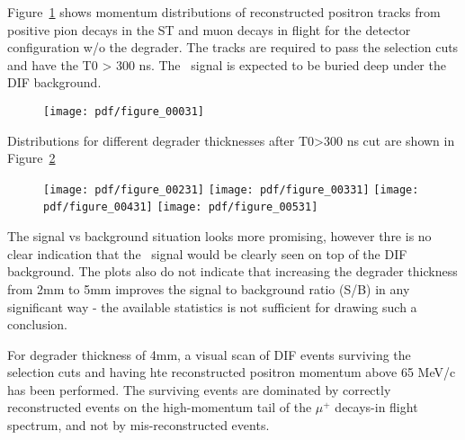 Figure~\ref{figure:no_deg_mom} shows momentum distributions of reconstructed
positron tracks from positive pion decays in the ST and muon decays in flight
for the detector configuration w/o the degrader. 
The tracks are required to pass the selection cuts and have the T0 > 300 ns. 
The \piplusenu\ signal is expected to be buried deep under the DIF background.

\begin{figure}[H]
  \texttt{[image: pdf/figure\_00031]}
  \caption{
    \label{figure:no_deg_mom}
  }
\end{figure}

Distributions for different degrader thicknesses after T0>300 ns cut are shown
in Figure~\ref{figure:deg_mom}

\begin{figure}[H]
  \texttt{[image: pdf/figure\_00231]}
  \texttt{[image: pdf/figure\_00331]}
  \texttt{[image: pdf/figure\_00431]}
  \texttt{[image: pdf/figure\_00531]}
  \caption{
    \label{figure:deg_mom}
  }
\end{figure}

The signal vs background situation looks more promising, however thre is no clear indication
that the \piplusenu\ signal would be clearly seen on top of the DIF background.
The plots also do not indicate that increasing the degrader thickness from 2mm to 5mm 
improves  the signal to background ratio (S/B) in any significant way - the available
statistics is not sufficient for drawing such a conclusion.

For degrader thickness of 4mm, a visual scan of DIF events surviving
the selection cuts and having  hte reconstructed positron momentum above 65 MeV/c
has been performed.
%
The surviving events are dominated by correctly reconstructed events on the high-momentum tail
of the $\mu^+$ decays-in flight spectrum, and not by mis-reconstructed events.

